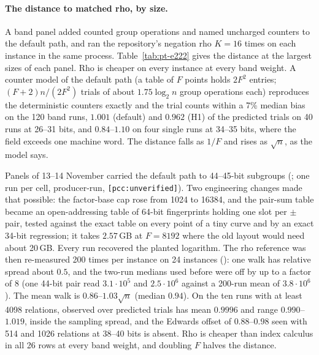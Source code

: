 \paragraph{The distance to matched rho, by size.} A band panel added
counted group operations and named uncharged counters to the default
path, and ran the repository's negation rho $K=16$ times on each instance in
the same process. Table~\ref{tab:pt-e222} gives the distance at the largest
sizes of each panel. Rho is cheaper on every instance at every band weight.
A counter model of the default path (a table of $F$ points holds $2F^2$
entries; $(F+2)n/(2F^2)$ trials of about $1.75\log_2 n$ group operations each)
reproduces the deterministic counters exactly and the trial counts within a
7\% median bias on the 120 band runs, $1.001$ (default) and $0.962$ (H1) of
the predicted trials on 40 runs at 26--31 bits, and $0.84$--$1.10$ on four
single runs at 34--35 bits, where the field exceeds one machine word. The
distance falls as $1/F$ and rises as $\sqrt n$, as the model says.

Panels of 13--14 November carried the default path to 44--45-bit subgroups
(; one run per
cell, producer-run, \texttt{[pcc:unverified]}). Two engineering changes made
that possible: the factor-base cap rose from 1024 to 16384, and the pair-sum
table became an open-addressing table of 64-bit fingerprints holding one slot
per $\pm$ pair, tested against the exact table on every point of a tiny curve
and by an exact 34-bit regression; it takes $2.57$\,GB at $F=8192$ where the
old layout would need about 20\,GB. Every run recovered the planted logarithm.
The rho reference was then re-measured 200 times per instance on 24 instances
(): one walk has
relative spread about $0.5$, and the two-run medians used before were off by
up to a factor of 8 (one 44-bit pair read $3.1\cdot10^5$ and $2.5\cdot10^6$
against a 200-run mean of $3.8\cdot10^6$). The mean walk is $0.86$--$1.03\sqrt n$
(median $0.94$). On the ten runs with at least 4098 relations, observed
over predicted trials has mean $0.9996$ and range $0.990$--$1.019$, inside the
sampling spread, and the Edwards offset of $0.88$--$0.98$ seen with 514 and
1026 relations at 38--40 bits is absent. Rho is cheaper than index calculus in
all 26 rows at every band weight, and doubling $F$ halves the distance.

